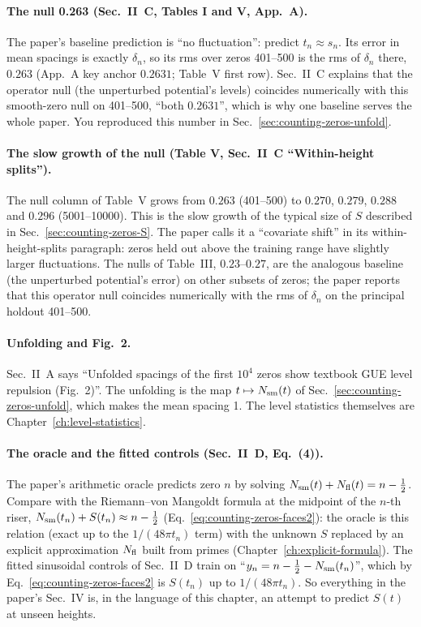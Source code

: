 \paragraph{The null 0.263 (Sec.~II~C, Tables I and V, App.~A).} The paper's baseline prediction is ``no fluctuation'': predict $t_n\approx s_n$. Its error in mean spacings is exactly $\delta_n$, so its rms over zeros 401--500 is the rms of $\delta_n$ there, $0.263$ (App.~A key anchor $0.2631$; Table~V first row). Sec.~II~C explains that the operator null (the unperturbed potential's levels) coincides numerically with this smooth-zero null on 401--500, ``both $0.2631$'', which is why one baseline serves the whole paper. You reproduced this number in Sec.~\ref{sec:counting-zeros-unfold}.

\paragraph{The slow growth of the null (Table V, Sec.~II~C ``Within-height splits'').} The null column of Table~V grows from $0.263$ (401--500) to $0.270$, $0.279$, $0.288$ and $0.296$ (5001--10000). This is the slow growth of the typical size of $S$ described in Sec.~\ref{sec:counting-zeros-S}. The paper calls it a ``covariate shift'' in its within-height-splits paragraph: zeros held out above the training range have slightly larger fluctuations. The nulls of Table~III, $0.23$--$0.27$, are the analogous baseline (the unperturbed potential's error) on other subsets of zeros; the paper reports that this operator null coincides numerically with the rms of $\delta_n$ on the principal holdout 401--500.

\paragraph{Unfolding and Fig.~2.} Sec.~II~A says ``Unfolded spacings of the first $10^4$ zeros show textbook GUE level repulsion (Fig.~2)''. The unfolding is the map $t\mapsto N_{\mathrm{sm}}(t)$ of Sec.~\ref{sec:counting-zeros-unfold}, which makes the mean spacing 1. The level statistics themselves are Chapter~\ref{ch:level-statistics}.

\paragraph{The oracle and the fitted controls (Sec.~II~D, Eq.~(4)).} The paper's arithmetic oracle predicts zero $n$ by solving $N_{\mathrm{sm}}(t)+N_{\mathrm{fl}}(t)=n-\tfrac12$. Compare with the Riemann--von Mangoldt formula at the midpoint of the $n$-th riser, $N_{\mathrm{sm}}(t_n)+S(t_n)\approx n-\tfrac12$ (Eq.~\eqref{eq:counting-zeros-faces2}): the oracle is this relation (exact up to the $1/(48\pi t_n)$ term) with the unknown $S$ replaced by an explicit approximation $N_{\mathrm{fl}}$ built from primes (Chapter~\ref{ch:explicit-formula}). The fitted sinusoidal controls of Sec.~II~D train on ``$y_n=n-\tfrac12-N_{\mathrm{sm}}(t_n)$'', which by Eq.~\eqref{eq:counting-zeros-faces2} is $S(t_n)$ up to $1/(48\pi t_n)$. So everything in the paper's Sec.~IV is, in the language of this chapter, an attempt to predict $S(t)$ at unseen heights.

